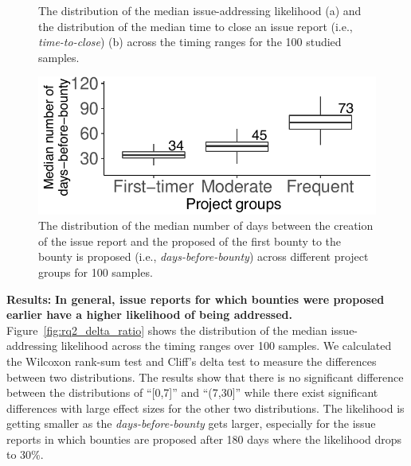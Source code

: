 \begin{figure}[t]
\begin{subfigure}[t]{0.5\columnwidth}
        \caption{}
          \label{fig:rq2_closeday_deltaday}
    \end{subfigure}
    \vspace{-0.1in}
    \caption{The distribution of the median issue-addressing likelihood (a) and the  distribution of the median time to close an issue report (i.e., \textit{time-to-close}) (b) across the  timing ranges for the 100 studied samples.
    }
\end{figure}
\begin{figure}[t]
\centering\includegraphics[width=0.8\columnwidth]{pics/rq2/new/rq2_medianDeltaTime.pdf}
  \caption{The distribution of the median number of days between the creation of the issue report and the proposed of the first bounty to the bounty is proposed (i.e., \textit{days-before-bounty}) across different project groups for 100 samples.}
  \label{fig:rq2_medianDeltaTime}
  \vspace{-0.15in}

\end{figure}




\noindent\textbf{Results:}\textbf{ In general, issue reports for which bounties were proposed earlier have a higher likelihood of being addressed.} Figure~\ref{fig:rq2_delta_ratio} shows the distribution of the median issue-addressing likelihood across the timing ranges over 100 samples. We calculated the Wilcoxon rank-sum test and Cliff's delta test to measure the differences between two distributions. The results show that there is no significant difference between the distributions of ``[0,7]'' and ``(7,30]'' while there exist significant differences with large effect sizes for the other two distributions.
The likelihood is getting smaller as the \textit{days-before-bounty} gets larger, especially for the issue reports in which bounties are proposed after 180 days where the likelihood drops to 30\%.

